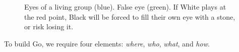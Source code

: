 \begin{figure}[H]
	\centering
	\begin{pgfgolayout}[columns = 2, width = natural]
		\begin{goban}[7, hoshi = {at = D4}]
		\end{goban}
		\begin{goban}[7, hoshi = {at = D4}]
		\end{goban}
	\end{pgfgolayout}
	\caption{
		Eyes of a living group (\textcolor{bg}{blue}). False eye (\textcolor{Moss}{green}). If White plays at the \textcolor{sealred}{red} point, Black will be forced to fill their own eye with a stone, or risk losing it.}
	\label{fig:Fig 12}
\end{figure}
To build Go, we require four elements: \textit{where}, \textit{who}, \textit{what}, and \textit{how}.
\newpage